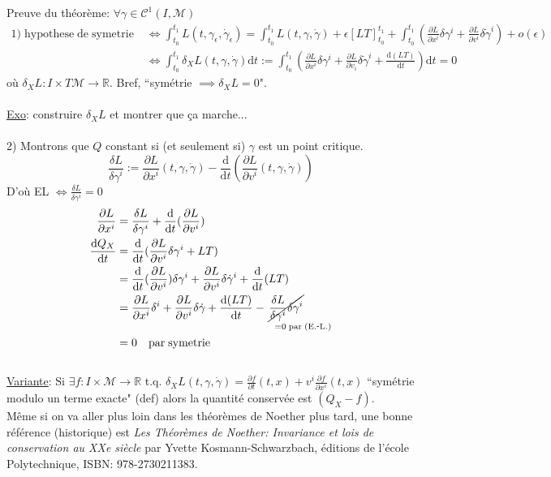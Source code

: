 \documentclass[a4paper,11pt]{article}
\renewcommand{\d}{{\mathrm{d}}}
\newcommand{\dr}[2]{\frac{\partial {#1}}{\partial{#2}}}
\begin{document}
Preuve du théorème:
$\forall \gamma \in \mathcal{C}^1(I,\mathcal{M})$\\
\begin{align*}
1) \;\mathrm{hypothese}\;\mathrm{de}\;\mathrm{symetrie}\;
&\iff \int_{t_0}^{t_1} L(t,\gamma_\epsilon,\dot\gamma_\epsilon) = \int_{t_0}^{t_1}L(t,\gamma,\dot\gamma) + \epsilon [LT]_{t_0}^{t_1} + \int_{t_0}^{t_1} \left(\dr{L}{x^i}\delta \gamma^i + \dr{L}{v^i}\delta\dot\gamma^i\right) +o(\epsilon)\\
&\iff \int_{t_0}^{t_1} \delta_X L(t,\gamma,\dot\gamma) \d t:=\int_{t_0}^{t_1} \left(\dr{L}{x^i}\delta \gamma^i + \dr{L}{v_i}\delta\dot \gamma^i + \frac{\d (LT)}{\d t}\right)\d t =0
\end{align*}
où $\delta_X L : I\times T\mathcal{M} \to \mathbb{R}$. 
Bref, ``symétrie $\implies \delta_X L = 0$".\\
\\
\underline{Exo}: construire $\delta_X L$ et montrer que ça marche...\\
\\
2) Montrons que $Q$ constant si (et seulement si) $\gamma$ est un point critique.
$$\frac{\delta L}{\delta \gamma^i} := \dr{L}{x^i}(t,\gamma,\dot\gamma) - \frac{\d}{\d t}(\dr{L}{v^i}(t,\gamma,\dot\gamma))$$
D'où EL $\iff \frac{\delta L}{\delta \gamma^i}=0$
\begin{align*}
\dr{L}{x^i}&= \frac{\delta L}{\delta \gamma^i} + \frac{\d}{\d t}(\dr{L}{v^i})\\
\frac{\d Q_X}{\d t}
&= \frac{\d}{\d t} (\dr{L}{v^i}\delta \gamma^i + LT)\\
&= \frac{\d}{\d t} (\dr{L}{v^i})\delta \gamma^i + \dr{L}{v^i} \delta\dot\gamma^i+\frac{\d}{\d t}(LT)\\
&= \dr{L}{x^i} \delta^i+\dr{L}{v^i}\delta \dot \gamma + \frac{\d (LT)}{\d t} - \!\!\!\!\!\!\!\!\!\!\!\!\!\!
\underset{\quad\quad\quad=0\;\mathrm{par}\;(\mathrm{E}.\scalebox{0.75}[1.0]{-}\mathrm{L}.)}{\cancel{\frac{\delta L}{\delta \gamma^i}\delta \gamma^i}}\\
&=0 \quad \mathrm{par} \; \mathrm{symetrie}
\end{align*}
\\
\underline{Variante}: Si $\exists f:I\times\mathcal{M}\to \mathbb{R}$ t.q. $\delta_X L(t,\gamma,\dot\gamma) = \frac{\partial f}{\partial t}(t,x) + v^i \frac{\partial f}{\partial x^i}(t,x)$ ``symétrie modulo un terme exacte" (def) alors la quantité conservée est $(Q_X -f)$.\\

Même si on va aller plus loin dans les théorèmes de Noether plus tard, une bonne référence (historique) est \emph{Les Théorèmes de Noether: Invariance et lois de conservation au XXe siècle} par  Yvette Kosmann-Schwarzbach, éditions de l'école Polytechnique, ISBN: 978-2730211383.
\end{document}
